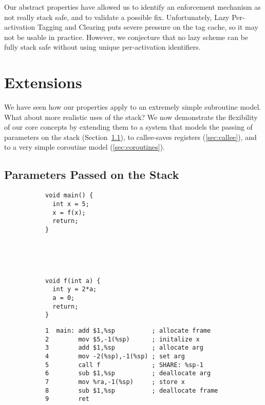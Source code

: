 \documentclass[acmsmall,review,anonymous]{acmart}\settopmatter{printfolios=true,printccs=false,printacmref=false}
\begin{document}
{%
Our abstract properties have allowed us to identify an enforcement mechanism as
not really stack safe, and to validate a possible fix.
Unfortunately, Lazy Per-activation Tagging and Clearing
puts severe pressure on the tag cache, so it may not be usable in practice.
However, we conjecture that no lazy scheme can be fully stack safe
without using unique per-activation identifiers.

\section{Extensions}
\label{sec:ext}

We have seen how our properties apply to an extremely simple
subroutine model.
What about more realistic uses of the stack? We now demonstrate the
flexibility of our core concepts by extending
them to a system that models the passing of
parameters on the stack (Section~\ref{sec:passing}), to callee-saves
registers  (\ref{sec:callee}), and to a very simple coroutine model
(\ref{sec:coroutines}).

\subsection{Parameters Passed on the Stack}
\label{sec:passing}

\newcommand{\mainpassc}{magenta}

\begin{figure}
  \centering
  \begin{subfigure}[t]{.2\textwidth}
{\small
\begin{verbatim}
void main() {
  int x = 5;
  x = f(x);
  return;
}





void f(int a) {
  int y = 2*a;
  a = 0;
  return;
}
\end{verbatim}
}
  \end{subfigure}
  \begin{subfigure}[t]{.6\textwidth}
{\small
\begin{verbatim}
1  main: add $1,%sp          ; allocate frame
2        mov $5,-1(%sp)      ; initalize x
3        add $1,%sp          ; allocate arg
4        mov -2(%sp),-1(%sp) ; set arg
5        call f              ; SHARE: %sp-1
6        sub $1,%sp          ; deallocate arg
7        mov %ra,-1(%sp)     ; store x
8        sub $1,%sp          ; deallocate frame
9        ret


\end{verbatim}}
\end{subfigure}
\end{figure}}
\end{document}
